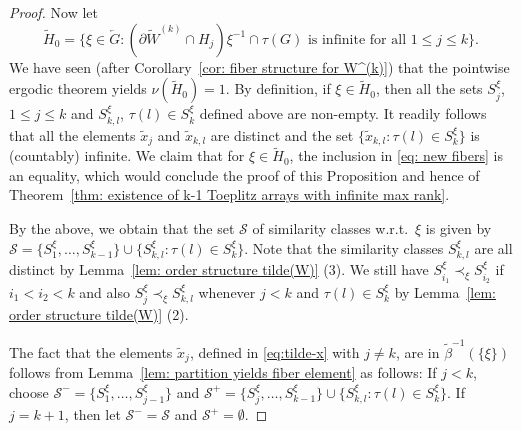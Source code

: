 \documentclass[titlepage,reqno,10pt]{amsart}
\theoremstyle{definition}
\begin{document}
\begin{proof}
Now let $$\widetilde{H}_0=\{\xi\in \overleftarrow{G}: (\partial \widetilde{W}^{(k)} \cap H_j)\xi^{-1}\cap \tau(G) \text{ is infinite for all } 1\leq j\leq k\}.$$
We have seen (after Corollary~\ref{cor: fiber structure for W^(k)}) that the pointwise ergodic theorem yields $\nu(\widetilde{H}_0) =1$. 
By definition, if $\xi\in \widetilde{H}_0$, then all the sets $S_j^\xi$, $1\leq j\leq k$ and $S_{k,l}^\xi$, $\tau(l)\in S_k^\xi$ defined above are non-empty.
It readily follows that all the elements $\widetilde{x}_j$ and $\widetilde{x}_{k,l}$ are distinct and the set $\{\widetilde{x}_{k,l}: \tau(l)\in S_k^\xi\}$ is (countably) infinite.
We claim that for $\xi\in \widetilde{H}_0$, the inclusion in \eqref{eq: new fibers} is an equality, which would conclude the proof of this Proposition and hence of Theorem~\ref{thm: existence of k-1 Toeplitz arrays with infinite max rank}.

By the above, we obtain that the set $\mathcal{S}$ of similarity classes w.r.t.\ $\xi$ is given by $\mathcal{S} =\{S_1^\xi,\ldots, S_{k-1}^\xi\} \cup \{S_{k,l}^\xi: \tau(l)\in S_k^\xi\}$.
Note that the similarity classes $S_{k,l}^\xi$ are all distinct by Lemma~\ref{lem: order structure tilde(W)} (3). 
We still have $S_{i_1}^\xi\prec_\xi S_{i_2}^\xi$ if $i_1<i_2<k$ and also $S_j^\xi\prec_\xi S_{k,l}^\xi$ whenever $j<k$ and $\tau(l)\in S_k^\xi$ by  Lemma~\ref{lem: order structure tilde(W)} (2). 

The fact that the elements $\widetilde{x}_j$, defined in \eqref{eq:tilde-x} with $j\neq k$, are in $\widetilde{\beta}^{-1}(\{\xi\})$ follows from Lemma~\ref{lem: partition yields fiber element} as follows:
If $j<k$, choose $\mathcal{S}^{-} = \{S_1^\xi,\ldots,S_{j-1}^\xi\}$ and $\mathcal{S}^{+} = \{S_j^\xi,\ldots,S_{k-1}^\xi\}\cup\{S_{k,l}^\xi:\tau(l)\in S_k^\xi\}$.
If $j=k+1$, then let $\mathcal{S}^{-}=\mathcal{S}$ and $\mathcal{S}^{+}=\emptyset$.


\end{proof}
\end{document}
